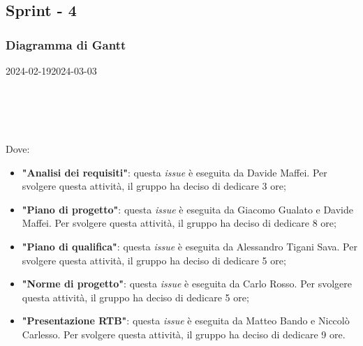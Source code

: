 \subsection{Sprint - 4}

\subsubsection{Diagramma di Gantt}

\begin{ganttchart}[
		x unit=0.6cm, %
		y unit chart=0.6cm,
		bar/.style={fill=blue!50},
		bar height=0.5,
		time slot format=isodate,
		time slot unit=day,
		vgrid,
		today=2024-02-19,
		today rule/.style={draw=red, ultra thick}
	]{2024-02-19}{2024-03-03}
	 \\
	 \\
	 \\
	 \\	
	 \\
\end{ganttchart}

Dove:
\begin{itemize}
	\item \textbf{"Analisi dei requisiti"}: questa \textit{issue} è eseguita da
	      Davide Maffei. Per
	      svolgere questa attività, il gruppo ha deciso di dedicare 3 ore;

	\item \textbf{"Piano di progetto"}: questa \textit{issue} è eseguita da
	      Giacomo Gualato e Davide Maffei. Per svolgere questa attività, il gruppo ha deciso
	      di dedicare 8 ore;

	\item \textbf{"Piano di qualifica"}: questa \textit{issue} è eseguita da
	      Alessandro Tigani Sava. Per svolgere questa attività, il gruppo ha
	      deciso di dedicare 5 ore;

	\item \textbf{"Norme di progetto"}: questa \textit{issue} è eseguita da Carlo Rosso. 
			Per svolgere questa attività, il gruppo ha deciso di
	      dedicare 5 ore;

	\item \textbf{"Presentazione RTB"}: questa \textit{issue} è eseguita
	      da Matteo Bando e Niccolò Carlesso. Per svolgere questa
	      attività, il gruppo ha deciso di dedicare 9 ore.
\end{itemize}

